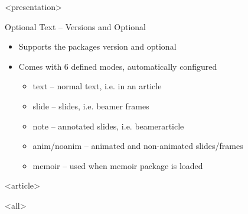 \mode
<presentation>

\begin{frame}{Optional Text -- Versions and Optional}
  \label{manual:optiona-text}

  \begin{itemize}
    \item Supports the packages version and optional
    \item Comes with 6 defined modes, automatically configured
      \begin{itemize}
        \item text         -- normal text, i.e. in an article
        \item slide        -- slides, i.e. beamer frames
        \item note         -- annotated slides, i.e. beamerarticle
        \item anim/noanim  -- animated and non-animated slides/frames
        \item memoir       -- used when memoir package is loaded
      \end{itemize}
  \end{itemize}

  \begin{example}
    }
  \end{example}
\end{frame}


\mode
<article>

\bigskip


\clearpage

\mode
<all>
